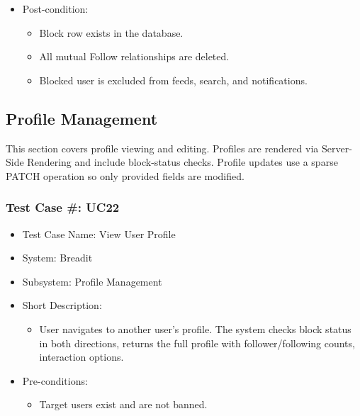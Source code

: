 \begin{itemize}
  \item Post-condition:
\begin{itemize}
  \item Block row exists in the database.
  \item All mutual Follow relationships are deleted.
  \item Blocked user is excluded from feeds, search, and notifications.
\end{itemize}
\end{itemize}

\subsection{Profile Management}

This section covers profile viewing and editing. Profiles are rendered via Server-Side Rendering and include block-status checks. Profile updates use a sparse PATCH operation so only provided fields are modified.

\subsubsection{Test Case \#: UC22}
\begin{itemize}
  \item Test Case Name: View User Profile
  \item System: Breadit
  \item Subsystem: Profile Management
\end{itemize}
\begin{itemize}
  \item Short Description:
\begin{itemize}
  \item User navigates to another user's profile. The system checks block status in both directions, returns the full profile with follower/following counts, interaction options.
\end{itemize}
  \item Pre-conditions:
\begin{itemize}
  \item Target users exist and are not banned.
\end{itemize}
\end{itemize}

